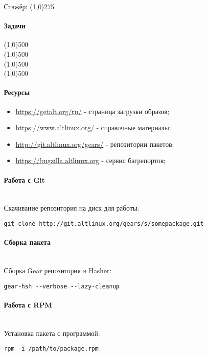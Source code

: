 \documentclass[notitlepage]{article}
\begin{document}
\begin{flushright}Стажёр: \line(1,0){275} \end{flushright}

\paragraph{Задачи}
\begin{center}
\line(1,0){500} \\
\line(1,0){500} \\
\line(1,0){500} \\
\line(1,0){500} \\
\end{center}

\paragraph{Ресурсы}
\begin{itemize}
\setlength\itemsep{0em}
\item \url{https://getalt.org/ru/} - страница загрузки образов;
\item \url{https://www.altlinux.org/} - справочные материалы;
\item \url{http://git.altlinux.org/gears/} - репозитории пакетов;
\item \url{https://bugzilla.altlinux.org} - сервис багрепортов;
\end{itemize}

\paragraph{Работа с Git}\mbox{} \\
Скачивание репозитория на диск для работы:
\begin{verbatim}
git clone http://git.altlinux.org/gears/s/somepackage.git
\end{verbatim}

\paragraph{Сборка пакета}\mbox{} \\
Сборка Gear репозитория в Hasher:
\begin{verbatim}
gear-hsh --verbose --lazy-cleanup
\end{verbatim}

\paragraph{Работа с RPM}\mbox{} \\
Установка пакета с программой:
\begin{verbatim}
rpm -i /path/to/package.rpm
\end{verbatim}
\end{document}
